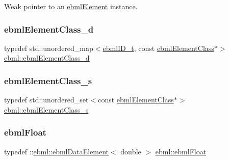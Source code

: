 Weak pointer to an \mbox{\hyperlink{classebml_1_1ebmlElement}{ebml\+Element}} instance. \mbox{\label{namespaceebml_a103756ab7f2c1c3c2bbc34334bd9b416}} 
\subsubsection{\texorpdfstring{ebml\+Element\+Class\+\_\+d}{ebmlElementClass\_d}}
{\footnotesize\ttfamily typedef std\+::unordered\+\_\+map$<$\mbox{\hyperlink{namespaceebml_a86c5f604ddf12a74aa9812e997a58691}{ebml\+I\+D\+\_\+t}}, const \mbox{\hyperlink{classebml_1_1ebmlElementClass}{ebml\+Element\+Class}}$\ast$$>$ \mbox{\hyperlink{namespaceebml_a103756ab7f2c1c3c2bbc34334bd9b416}{ebml\+::ebml\+Element\+Class\+\_\+d}}}

\mbox{\label{namespaceebml_a014ea85f559c01fc8f53b63240eecc8a}} 
\subsubsection{\texorpdfstring{ebml\+Element\+Class\+\_\+s}{ebmlElementClass\_s}}
{\footnotesize\ttfamily typedef std\+::unordered\+\_\+set$<$const \mbox{\hyperlink{classebml_1_1ebmlElementClass}{ebml\+Element\+Class}}$\ast$$>$ \mbox{\hyperlink{namespaceebml_a014ea85f559c01fc8f53b63240eecc8a}{ebml\+::ebml\+Element\+Class\+\_\+s}}}

\mbox{\label{namespaceebml_af998fa3b620e1bb7363e1426c9910b9c}} 
\subsubsection{\texorpdfstring{ebml\+Float}{ebmlFloat}}
{\footnotesize\ttfamily typedef \+::\mbox{\hyperlink{classebml_1_1ebmlDataElement}{ebml\+::ebml\+Data\+Element}}$<$ double $>$ \mbox{\hyperlink{namespaceebml_af998fa3b620e1bb7363e1426c9910b9c}{ebml\+::ebml\+Float}}}

\mbox{\label{namespaceebml_a2e365f10ba5435bdd5c1fd909a601f31}} 
